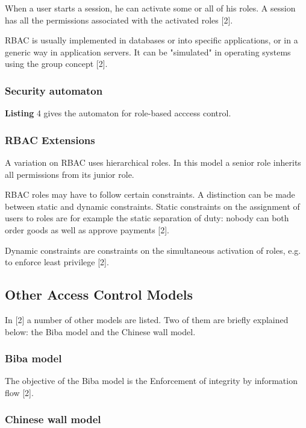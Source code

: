 When a user starts a session, he can activate some or all of his roles. A session has all the permissions associated with the activated roles [2].

RBAC is usually implemented in databases or into specific applications, or in a generic way in application servers. It can be "simulated" in operating systems using the group concept [2].




\subsubsection{Security automaton}

\textbf{Listing} 4 gives the automaton for role-based acccess control.




\subsubsection{RBAC Extensions}

A variation on RBAC uses hierarchical roles. In this model a senior role inherits all permissions from its junior role.

RBAC roles may have to follow certain constraints. A distinction can be made between static and dynamic constraints. Static constraints on the assignment of users to roles are for example the static separation of duty: nobody can both order goods as well as approve payments [2].

Dynamic constraints are constraints on the simultaneous activation of roles, e.g. to enforce least privilege [2].



\subsection{Other Access Control Models}

In [2] a number of other models are listed. Two of them are briefly explained below: the Biba model and the Chinese wall model.

\subsubsection{Biba model}

The objective of the Biba model is the Enforcement of integrity by information flow [2].


\subsubsection{Chinese wall model}

